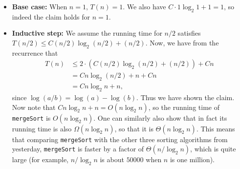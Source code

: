 \documentclass[11pt]{article}
\begin{document}
\begin{itemize}
\item \textbf{Base case:} When $n=1$, $T(n) = 1$.  We also have
  $C\cdot 1\log_2  1 + 1 = 1$, so indeed the claim holds for $n=1$.
\item \textbf{Inductive step:} We assume the running time for $n/2$
  satisfies $T(n/2) \le C(n/2)\log_2(n/2) + (n/2)$.  Now, we
  have from the recurrence that 
\begin{align*}
T(n) & \le 2\cdot (C(n/2)\log_2(n/2) +
  (n/2)) + Cn\\
{}&=  Cn\log_2(n/2) + n + Cn\\
{}&=  Cn\log_2 n + n ,
\end{align*}
since $\log(a/b) = \log(a) - \log(b)$.  Thus we have shown the claim.
Now note that $Cn\log_2 n + n = O(n\log_2 n)$, so the running time of
\texttt{mergeSort} is $O(n\log_2 n)$.  One can similarly also show
that in fact its running time is also $\Omega(n\log_2 n)$, so that it
is $\Theta(n\log_2 n)$.  This means that comparing \texttt{mergeSort}
with the other three sorting algorithms from yesterday,
\texttt{mergeSort} is faster by a factor of $\Theta(n/\log_2 n)$,
which is quite large (for example, $n/\log_2 n$ is about $50000$ when
$n$ is one million).
\end{itemize}
\end{document}
